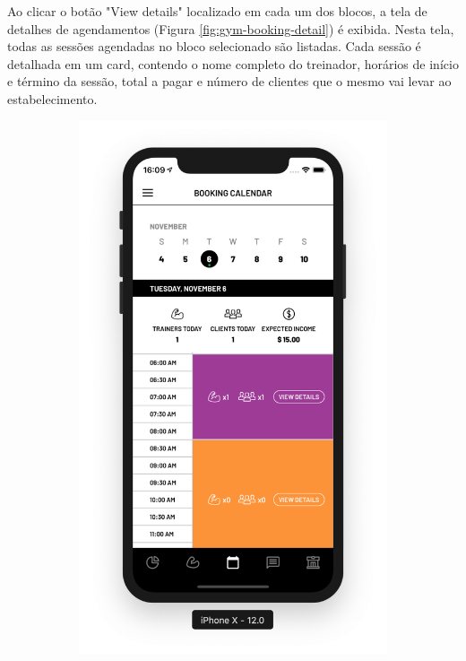 Ao clicar o botão "View details" localizado em cada um dos blocos, a tela de detalhes de agendamentos (Figura \ref{fig:gym-booking-detail}) é exibida. Nesta tela, todas as sessões agendadas no bloco selecionado são listadas. Cada sessão é detalhada em um card, contendo o nome completo do treinador, horários de início e término da sessão, total a pagar e número de clientes que o mesmo vai levar ao estabelecimento.

\begin{figure}[H]
	\centering
    \begin{subfigure}[b]{0.4\textwidth}
        \includegraphics[width=\textwidth]{pfc/figuras/gym-booking-calendar.png}

\end{subfigure}
\end{figure}

